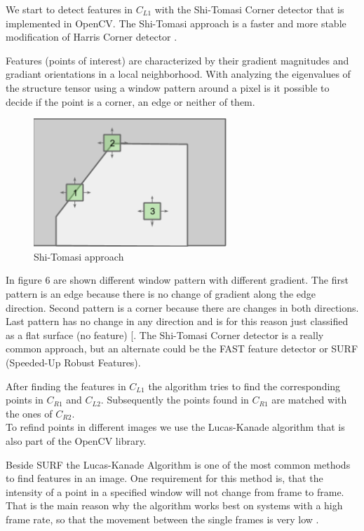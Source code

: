 \documentclass[11pt]{article}
\begin{document}
	We start to detect features in $C_{L1}$ with the Shi-Tomasi Corner detector that is implemented in OpenCV. The Shi-Tomasi approach is a faster and more stable modification of Harris Corner detector \cite{Shi-Tomasi_Wiki}. 

	Features (points of interest) are characterized by their gradient magnitudes and gradiant orientations in a local neighborhood. With analyzing the eigenvalues of the structure tensor using a window pattern around a pixel is it possible to decide if the point is a corner, an edge or neither of them. 
	
	\begin{figure}[H]
		\centering
		\includegraphics[width=0.65\textwidth]{images/tomasi.png}
		\caption{Shi-Tomasi approach}
	\end{figure}
	
	In figure 6 are shown different window pattern with different gradient. The first pattern is an edge because there is no change of gradient along the edge direction. Second pattern is a corner because there are changes in both directions. Last pattern has no change in any direction and is for this reason just classified as a flat surface (no feature) [\cite{Shi-Tomasi, FeatureDetection}. The Shi-Tomasi Corner detector is a really common approach, but an alternate could be the FAST feature detector or SURF (Speeded-Up Robust Features). 

	After finding the features in $C_{L1}$ the algorithm tries to find the corresponding points in $C_{R1}$ and $C_{L2}$. Subsequently the points found in $C_{R1}$ are matched with the ones of $C_{R2}$.\\
	To refind points in different images we use the Lucas-Kanade algorithm that is also part of the OpenCV library.

	Beside SURF the Lucas-Kanade Algorithm is one of the most common methods to find features in an image. One requirement for this method is, that the intensity of a point in a specified window will not change from frame to frame. That is the main reason why the algorithm works best on systems with a high frame rate, so that the movement between the single frames is very low \cite{Lucas_Kanade}. 
\end{document}
